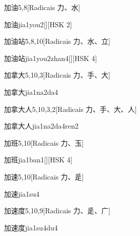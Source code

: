 \begin{entry}{加油}{5,8}[Radicais ⼒、⽔]
  \begin{phonetics}{加油}{jia1you2}[][HSK 2]
  \end{phonetics}
\end{entry}

\begin{entry}{加油站}{5,8,10}[Radicais ⼒、⽔、⽴]
  \begin{phonetics}{加油站}{jia1you2zhan4}[][HSK 4]
  \end{phonetics}
\end{entry}

\begin{entry}{加拿大}{5,10,3}[Radicais ⼒、⼿、⼤]
  \begin{phonetics}{加拿大}{jia1na2da4}
  \end{phonetics}
\end{entry}

\begin{entry}{加拿大人}{5,10,3,2}[Radicais ⼒、⼿、⼤、⼈]
  \begin{phonetics}{加拿大人}{jia1na2da4ren2}
  \end{phonetics}
\end{entry}

\begin{entry}{加班}{5,10}[Radicais ⼒、⽟]
  \begin{phonetics}{加班}{jia1ban1}[][HSK 4]
  \end{phonetics}
\end{entry}

\begin{entry}{加速}{5,10}[Radicais ⼒、⾡]
  \begin{phonetics}{加速}{jia1su4}
  \end{phonetics}
\end{entry}

\begin{entry}{加速度}{5,10,9}[Radicais ⼒、⾡、⼴]
  \begin{phonetics}{加速度}{jia1su4du4}
  \end{phonetics}
\end{entry}

